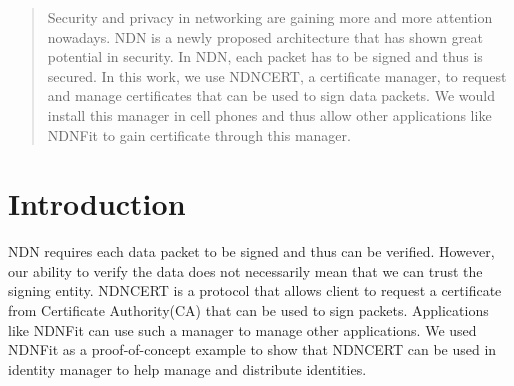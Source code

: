 \documentclass[a0,portrait]{poster}
\begin{document}
\begin{multicols}{2} %


\color{Navy} %

\begin{abstract}

Security and privacy in networking are gaining more and more attention nowadays. NDN is a newly proposed architecture that has shown great potential in security. In NDN, each packet has to be signed and thus is secured. In this work, we use NDNCERT, a certificate manager, to request and manage certificates that can be used to sign data packets. We would install this manager in cell phones and thus allow other applications like NDNFit to gain certificate through this manager. 

\end{abstract}


\color{SaddleBrown} %

\section*{Introduction}
NDN requires each data packet to be signed and thus can be verified. However, our ability to verify the data does not necessarily mean that we can trust the signing entity. NDNCERT is a protocol that allows client to request a certificate from Certificate Authority(CA) that can be used to sign packets. Applications like NDNFit can use such a manager to manage other applications. We used NDNFit as a proof-of-concept example to show that NDNCERT can be used in identity manager to help manage and distribute identities.


\color{DarkSlateGray} %


\end{multicols}
\end{document}
